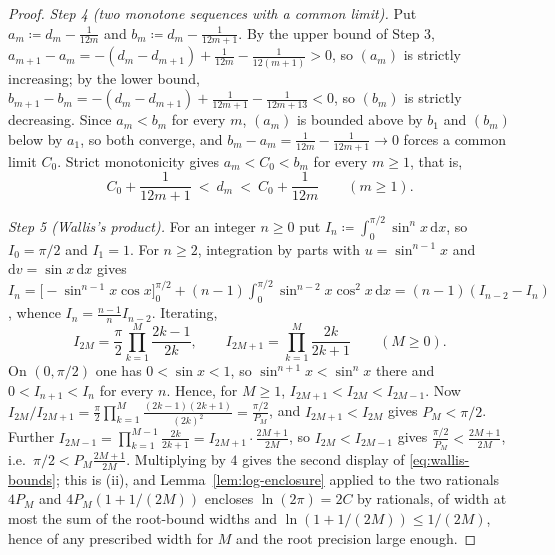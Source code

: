 \begin{proof}
\emph{Step 4 (two monotone sequences with a common limit).} Put
$a_m\coloneqq d_m-\frac{1}{12m}$ and $b_m\coloneqq d_m-\frac{1}{12m+1}$. By
the upper bound of Step 3,
$a_{m+1}-a_m=-(d_m-d_{m+1})+\frac{1}{12m}-\frac{1}{12(m+1)}>0$, so $(a_m)$
is strictly increasing; by the lower bound,
$b_{m+1}-b_m=-(d_m-d_{m+1})+\frac{1}{12m+1}-\frac{1}{12m+13}<0$, so $(b_m)$
is strictly decreasing. Since $a_m<b_m$ for every $m$, $(a_m)$ is bounded
above by $b_1$ and $(b_m)$ below by $a_1$, so both converge, and
$b_m-a_m=\frac{1}{12m}-\frac{1}{12m+1}\to0$ forces a common limit $C_0$.
Strict monotonicity gives $a_m<C_0<b_m$ for every $m\ge1$, that is,
\begin{equation}\label{eq:robbins-C0}
  C_0+\frac{1}{12m+1}\ <\ d_m\ <\ C_0+\frac{1}{12m}\qquad(m\ge1).
\end{equation}

\emph{Step 5 (Wallis's product).} For an integer $n\ge0$ put
$I_n\coloneqq\int_0^{\pi/2}\sin^{n}x\,\mathrm{d}x$, so $I_0=\pi/2$ and
$I_1=1$. For $n\ge2$, integration by parts with $u=\sin^{n-1}x$ and
$\mathrm{d}v=\sin x\,\mathrm{d}x$ gives
$I_n=\big[-\sin^{n-1}x\cos x\big]_0^{\pi/2}
+(n-1)\int_0^{\pi/2}\sin^{n-2}x\cos^{2}x\,\mathrm{d}x
=(n-1)(I_{n-2}-I_n)$, whence $I_n=\frac{n-1}{n}I_{n-2}$. Iterating,
\begin{equation*}
  I_{2M}=\frac{\pi}{2}\prod_{k=1}^{M}\frac{2k-1}{2k},
  \qquad
  I_{2M+1}=\prod_{k=1}^{M}\frac{2k}{2k+1}\qquad(M\ge0).
\end{equation*}
On $(0,\pi/2)$ one has $0<\sin x<1$, so $\sin^{n+1}x<\sin^{n}x$ there and
$0<I_{n+1}<I_n$ for every $n$. Hence, for $M\ge1$,
$I_{2M+1}<I_{2M}<I_{2M-1}$. Now
$I_{2M}/I_{2M+1}=\frac{\pi}{2}\prod_{k=1}^{M}\frac{(2k-1)(2k+1)}{(2k)^{2}}
=\frac{\pi/2}{P_M}$, and $I_{2M+1}<I_{2M}$ gives $P_M<\pi/2$. Further
$I_{2M-1}=\prod_{k=1}^{M-1}\frac{2k}{2k+1}=I_{2M+1}\cdot\frac{2M+1}{2M}$, so
$I_{2M}<I_{2M-1}$ gives $\frac{\pi/2}{P_M}<\frac{2M+1}{2M}$, i.e.\
$\pi/2<P_M\frac{2M+1}{2M}$. Multiplying by $4$ gives the second display of
\eqref{eq:wallis-bounds}; this is (ii), and Lemma~\ref{lem:log-enclosure}
applied to the two rationals $4P_M$ and $4P_M(1+1/(2M))$ encloses
$\ln(2\pi)=2C$ by rationals, of width at most the sum of the root-bound
widths and $\ln(1+1/(2M))\le1/(2M)$, hence of any prescribed width for $M$
and the root precision large enough.


\end{proof}
